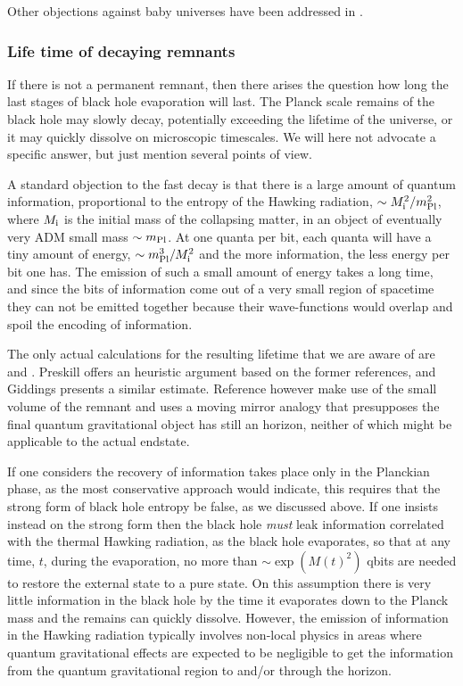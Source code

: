 \documentclass[12pt]{article}
\begin{document}
Other objections against baby universes have been addressed in \cite{Hsu:2006pe}.



\subsubsection*{Life time of decaying remnants}

If there is not a permanent remnant, then there arises the question how long the last stages of black hole evaporation will last. 
The Planck scale remains of the black hole may slowly decay, potentially exceeding the lifetime of the universe, or it may quickly dissolve on
microscopic timescales. We will here not advocate
a specific answer, but just mention several points of view.

A standard objection to the fast decay is that there is a large amount of quantum information, proportional to the entropy of the 
Hawking radiation, $\sim M_{{\rm i}}^2/m_{{\rm Pl}}^2$, where $M_{\rm i}$ is the initial mass of the collapsing matter, in an object of 
eventually very ADM small mass $\sim m_{{\rm Pl}}$.  At one quanta per bit, each quanta
will have a tiny amount of energy, $\sim m_{{\rm Pl}}^3 /M_{{\rm i}}^2$ and the more information, the less energy per bit one has. 
The emission of such a  small amount of energy takes a long time,  and since the bits of information come out of a very small region of 
spacetime they can not be emitted together because their wave-functions would overlap and spoil the encoding of information.

The only actual calculations for the resulting lifetime that we are aware of are \cite{remnantevap1} and \cite{remnantevap2}. Preskill 
\cite{Preskill} offers an heuristic argument based on the former references, and Giddings \cite{Giddings:1992hh} presents a similar estimate. Reference 
\cite{remnantevap1} however make use of the small volume
of the remnant and \cite{remnantevap2} uses a moving mirror analogy that presupposes the final
quantum gravitational object has still an horizon, neither of which might be applicable to the actual endstate.  

If one considers the recovery of information takes place only in the Planckian phase, as the most conservative
approach would indicate, this requires that the strong form of black hole entropy be false, as we discussed above. If one insists instead on the strong form then 
the black hole {\it must} leak information correlated with the thermal Hawking radiation, as the black hole evaporates, so that at any time, $t$, during the evaporation,  no more than $\sim \exp( M (t)^2) $ qbits are needed to restore the external state to a pure state.  On this assumption there is very little information in the black hole by the time it evaporates down to the Planck mass and the remains can quickly dissolve. However, the
emission of information in the Hawking radiation typically involves non-local physics in areas where quantum gravitational effects
are expected to be negligible to get the information from the quantum gravitational region to and/or through the horizon.
\end{document}
